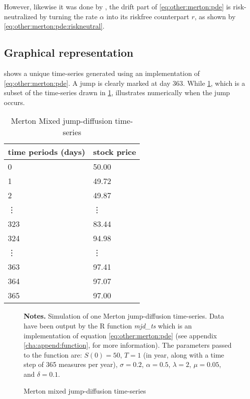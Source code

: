 \documentclass[12pt,a4paper]{report}
\begin{document}
However, likewise it was done by \citet{bs}, the drift part of \cref{eq:other:merton:pde} is risk-neutralized by turning the rate $\alpha$ into its riskfree counterpart $r$, as shown by \cref{eq:other:merton:pde:riskneutral}.



\subsection{Graphical representation}
\label{sub:other:merton:graphical}   

 shows a unique time-series generated using an implementation of \cref{eq:other:merton:pde}. A jump is clearly marked at day 363. While
\cref{t:other:merton:path}, which is a subset of the time-series drawn in \cref{p:other:merton:path}, illustrates numerically when the jump occurs.

\begin{table}[ht]
\centering
\begin{tabular}{ll}
  \hline
 time periods (days)& stock price\\ 
  \hline
  0   &50.00 \\ 
  1   &49.72 \\ 
  2   &49.87 \\ 
  \vdots & \vdots \\
  323 &83.44 \\ 
  324 &94.98 \\ 
  \vdots & \vdots \\
  363 &97.41 \\ 
  364 &97.07 \\ 
  365 &97.00 \\ 
   \hline
\end{tabular}
\caption{Merton Mixed jump-diffusion time-series}
\label{t:other:merton:path}
\end{table}

\begin{figure}[ht]
  \centering
   
  \begin{changemargin}{0.5cm}{0.5cm}
  \medskip
\footnotesize
{}\textbf{Notes.} Simulation of one Merton jump-diffusion time-series. Data have been output by the R function \textit{mjd\_ts} which is an implementation of equation \cref{eq:other:merton:pde} (see appendix \ref{cha:append:function}, for more information). The parameters passed to the function are:  $S(0) = 50$,   $T = 1$ (in year, along with a time step of 365 measures per year),  $\sigma = 0.2$, $\alpha = 0.5$,  $\lambda = 2$,  $\mu = 0.05$, and $\delta = 0.1$.   
\end{changemargin}
  \caption{Merton mixed jump-diffusion time-series}
  \label{p:other:merton:path}
\end{figure}
\end{document}
